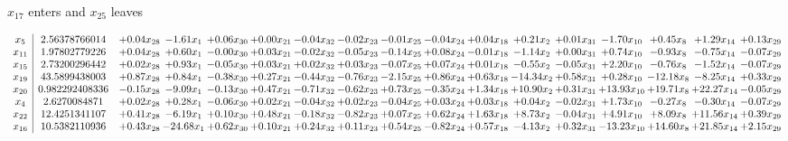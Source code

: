 \documentclass[9pt]{article}
\begin{document}
 $ x_{17} $ enters and $ x_{25} $ leaves 

 \[\begin{array}{c| c c@{\hskip 2pt} c@{\hskip 2pt} c@{\hskip 2pt} c@{\hskip 2pt} c@{\hskip 2pt} c@{\hskip 2pt} c@{\hskip 2pt} c@{\hskip 2pt} c@{\hskip 2pt} c@{\hskip 2pt} c@{\hskip 2pt} c@{\hskip 2pt} c@{\hskip 2pt} c@{\hskip 2pt} c@{\hskip 2pt} }
 x_{5}   &  2.56378766014 & +  0.04 x_{28} & -1.61 x_{1} & +  0.06 x_{30} & +  0.00 x_{21} & -0.04 x_{32} & -0.02 x_{23} & -0.01 x_{25} & -0.04 x_{24} & +  0.04 x_{18} & +  0.21 x_{2} & +  0.01 x_{31} & -1.70 x_{10} & +  0.45 x_{8} & +  1.29 x_{14} & +  0.13 x_{29}\\
 x_{11}   &  1.97802779226 & +  0.04 x_{28} & +  0.60 x_{1} & -0.00 x_{30} & +  0.03 x_{21} & -0.02 x_{32} & -0.05 x_{23} & -0.14 x_{25} & +  0.08 x_{24} & -0.01 x_{18} & -1.14 x_{2} & +  0.00 x_{31} & +  0.74 x_{10} & -0.93 x_{8} & -0.75 x_{14} & -0.07 x_{29}\\
 x_{15}   &  2.73200296442 & +  0.02 x_{28} & +  0.93 x_{1} & -0.05 x_{30} & +  0.03 x_{21} & +  0.02 x_{32} & +  0.03 x_{23} & -0.07 x_{25} & +  0.07 x_{24} & +  0.01 x_{18} & -0.55 x_{2} & -0.05 x_{31} & +  2.20 x_{10} & -0.76 x_{8} & -1.52 x_{14} & -0.07 x_{29}\\
 x_{19}   &  43.5899438003 & +  0.87 x_{28} & +  0.84 x_{1} & -0.38 x_{30} & +  0.27 x_{21} & -0.44 x_{32} & -0.76 x_{23} & -2.15 x_{25} & +  0.86 x_{24} & +  0.63 x_{18} & -14.34 x_{2} & +  0.58 x_{31} & +  0.28 x_{10} & -12.18 x_{8} & -8.25 x_{14} & +  0.33 x_{29}\\
 x_{20}   &  0.982292408336 & -0.15 x_{28} & -9.09 x_{1} & -0.13 x_{30} & +  0.47 x_{21} & -0.71 x_{32} & -0.62 x_{23} & +  0.73 x_{25} & -0.35 x_{24} & +  1.34 x_{18} & + 10.90 x_{2} & +  0.31 x_{31} & + 13.93 x_{10} & + 19.71 x_{8} & + 22.27 x_{14} & -0.05 x_{29}\\
 x_{4}   &  2.6270084871 & +  0.02 x_{28} & +  0.28 x_{1} & -0.06 x_{30} & +  0.02 x_{21} & -0.04 x_{32} & +  0.02 x_{23} & -0.04 x_{25} & +  0.03 x_{24} & +  0.03 x_{18} & +  0.04 x_{2} & -0.02 x_{31} & +  1.73 x_{10} & -0.27 x_{8} & -0.30 x_{14} & -0.07 x_{29}\\
 x_{22}   &  12.4251341107 & +  0.41 x_{28} & -6.19 x_{1} & +  0.10 x_{30} & +  0.48 x_{21} & -0.18 x_{32} & -0.82 x_{23} & +  0.07 x_{25} & +  0.62 x_{24} & +  1.63 x_{18} & +  8.73 x_{2} & -0.04 x_{31} & +  4.91 x_{10} & +  8.09 x_{8} & + 11.56 x_{14} & +  0.39 x_{29}\\
 x_{16}   &  10.5382110936 & +  0.43 x_{28} & -24.68 x_{1} & +  0.62 x_{30} & +  0.10 x_{21} & +  0.24 x_{32} & +  0.11 x_{23} & +  0.54 x_{25} & -0.82 x_{24} & +  0.57 x_{18} & -4.13 x_{2} & +  0.32 x_{31} & -13.23 x_{10} & + 14.60 x_{8} & + 21.85 x_{14} & +  2.15 x_{29}\\

\end{array}\]
\end{document}
